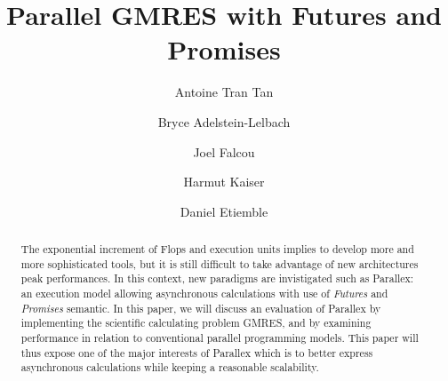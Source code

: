 \documentclass{llncs}
\begin{document}
\title{Parallel GMRES with Futures and Promises}

\author{Antoine Tran Tan \and Bryce Adelstein-Lelbach \and Joel Falcou \and Harmut Kaiser \and
Daniel Etiemble }

\maketitle

\begin{abstract}
The exponential increment of Flops and execution units implies to develop more and more sophisticated tools, but it is still difficult to take advantage of new architectures peak performances. In this context, new paradigms are invistigated such as Parallex: an execution model allowing asynchronous calculations with use of \emph{Futures} and \emph{Promises} semantic. In this paper, we will discuss an evaluation of Parallex by implementing the scientific calculating problem GMRES, and by examining performance in relation to conventional parallel programming models. This paper will thus expose one of the major interests of Parallex which is to better express asynchronous calculations while keeping a reasonable scalability. 
\end{abstract}
\end{document}

